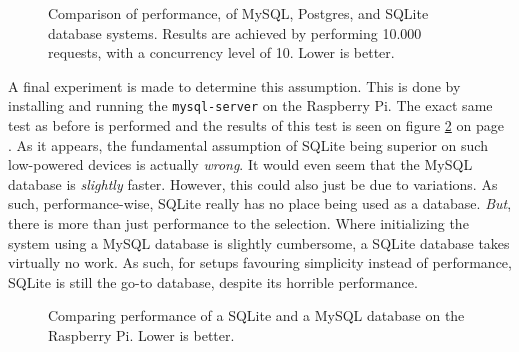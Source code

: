 	\begin{figure}[!h]
		\centering
	    \caption{Comparison of performance, of MySQL, Postgres, and SQLite database systems. Results are achieved by performing 10.000 requests, with a concurrency level of 10. Lower is better.}
	    \label{fig:bench:db}
	\end{figure}

	A final experiment is made to determine this assumption. This is done by installing and running the \verb=mysql-server= on the Raspberry Pi. The exact same test as before is performed and the results of this test is seen on figure \ref{fig:bench:rpi-bench} on page \pageref{fig:bench:rpi-bench}. As it appears, the fundamental assumption of SQLite being superior on such low-powered devices is actually \emph{wrong}. It would even seem that the MySQL database is \emph{slightly} faster. However, this could also just be due to variations. As such, performance-wise, SQLite really has no place being used as a database. \emph{But}, there is more than just performance to the selection. Where initializing the system using a MySQL database is slightly cumbersome, a SQLite database takes virtually no work. As such, for setups favouring simplicity instead of performance, SQLite is still the go-to database, despite its horrible performance.

	\begin{figure}[!h]
		\centering
	    \caption{Comparing performance of a SQLite and a MySQL database on the Raspberry Pi. Lower is better.}
	    \label{fig:bench:rpi-bench}
	\end{figure}


